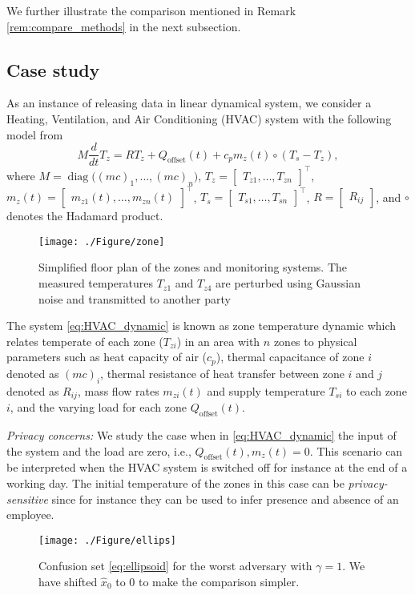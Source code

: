 \documentclass{ifacconf}
\DeclareMathOperator{\diag}{diag}
\def\be{\begin{equation}}
\def\ee{\end{equation}}
\newcommand{\bbm}{\begin{bmatrix}}
\newcommand{\ebm}{\end{bmatrix}}
\newcommand{\+}{\mathsmaller{+}}
\begin{document}
We further illustrate the comparison mentioned in Remark \ref{rem:compare_methods} in the next subsection.
\subsection{Case study}
As an instance of releasing data in linear dynamical system, we consider a Heating, Ventilation, and Air Conditioning (HVAC) system with the following model from \cite{kelman2011bilinear} 
\be\label{eq:HVAC_dynamic}
M\frac{d}{dt}T_z = RT_z + {Q}_{\text{offset}}(t) + c_p{m}_z(t)\circ(T_s - T_z),
\ee
where $M = \diag\big((mc)_1,\ldots, (mc)_n\big)$, $T_z = \bbm T_{z1}, \ldots, T_{zn}\ebm^{\top}$, ${m}_z(t) = \bbm {m}_{z1}(t), \ldots, {m}_{zn}(t)\ebm^{\top} $, $T_s =  \bbm T_{s1}, \ldots, T_{sn}\ebm^{\top} $, $R = \bbm R_{ij}\ebm$, and $\circ$ denotes the Hadamard product. 
\begin{figure}[ht]
	\begin{center}
		\texttt{[image: ./Figure/zone]}
		\caption{Simplified floor plan of the zones and monitoring systems. The measured temperatures $T_{z1}$ and $T_{z4}$ are perturbed using Gaussian noise and transmitted to another party }\label{fig:zones}
	\end{center}
\end{figure}
\par The system \eqref{eq:HVAC_dynamic} is known as zone temperature dynamic which relates temperate of each zone ($T_{zi}$) in an area with $n$ zones to physical parameters such as heat capacity of air ($c_p$), thermal capacitance of zone $i$ denoted as $(mc)_i$, thermal resistance of heat transfer between zone $i$ and $j$ denoted as $R_{ij}$, mass flow rates ${m}_{zi}(t)$ and supply temperature $T_{si}$ to each zone $i$, and the varying load for each zone ${Q}_{\text{offset}}(t)$.  
\par \textit{Privacy concerns:} We study the case when in \eqref{eq:HVAC_dynamic} the input of the system and the load are zero, i.e., ${Q}_{\text{offset}}(t), {m}_z(t) = 0$. This scenario can be interpreted when the HVAC system is switched off for instance at the end of a working day. The initial temperature of the zones in this case can be \textit{privacy-sensitive} since for instance they can be used to infer presence and absence of an employee. 
\begin{figure}[ht]
	\begin{center}
		\texttt{[image: ./Figure/ellips]}
		\caption{Confusion set \eqref{eq:ellipsoid} for the worst adversary with $\gamma =1$. We have shifted $\hat{x}_0$ to $0$ to make the comparison simpler. }\label{fig:ellips}
	\end{center}
\end{figure}
\end{document}
